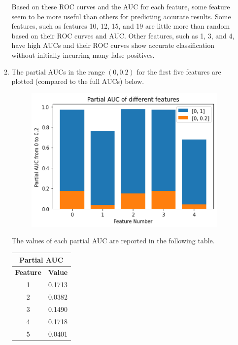\documentclass{article}
\begin{document}
\begin{enumerate}
\begin{enumerate}
	Based on these ROC curves and the AUC for each feature, some feature seem to be more useful than others for predicting accurate results. Some features, such as features 10, 12, 15, and 19 are little more than random based on their ROC curves and AUC. Other features, such as 1, 3, and 4, have high AUCs and their ROC curves show accurate classification without initially incurring many false positives.

\item The partial AUCs in the range $(0, 0.2)$ for the first five features are plotted (compared to the full AUCs) below.
	\begin{figure}[H]
                \centering
                \includegraphics[scale=0.4]{img/partial_auc.png}
        \end{figure}
	The values of each partial AUC are reported in the following table.
	\begin{center}
		\begin{tabular}{|c|c|}
			\hline
			\multicolumn{2}{|c|}{Partial AUC} \\
			\hline
			\textbf{Feature} & \textbf{Value} \\  
			\hline
			1 & 0.1713 \\
			2 & 0.0382 \\
			3 & 0.1490 \\
			4 & 0.1718 \\
			5 & 0.0401 \\
			\hline
		\end{tabular}
	\end{center}


\end{enumerate}
\end{enumerate}
\end{document}
